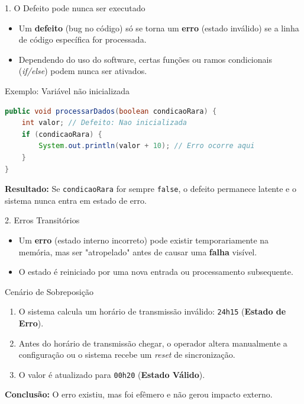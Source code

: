 \documentclass[9pt]{beamer}
\begin{document}
\begin{frame}[fragile]{1. O Defeito pode nunca ser executado}
  \begin{itemize}
    \item Um \textbf{defeito} (bug no código) só se torna um \textbf{erro} (estado inválido) se a linha de código específica for processada.
    \item Dependendo do uso do software, certas funções ou ramos condicionais (\textit{if/else}) podem nunca ser ativados.
  \end{itemize}

  \begin{block}{Exemplo: Variável não inicializada}
    \begin{lstlisting}[language=Java, basicstyle=\ttfamily\small]
public void processarDados(boolean condicaoRara) {
    int valor; // Defeito: Nao inicializada
    if (condicaoRara) {
        System.out.println(valor + 10); // Erro ocorre aqui
    }
}
    \end{lstlisting}
  \end{block}
  
  \textbf{Resultado:} Se \texttt{condicaoRara} for sempre \texttt{false}, o defeito permanece latente e o sistema nunca entra em estado de erro.
\end{frame}

\begin{frame}{2. Erros Transitórios}
  \begin{itemize}
    \item Um \textbf{erro} (estado interno incorreto) pode existir temporariamente na memória, mas ser "atropelado" antes de causar uma \textbf{falha} visível.
    \item O estado é reiniciado por uma nova entrada ou processamento subsequente.
  \end{itemize}

  \begin{exampleblock}{Cenário de Sobreposição}
    \begin{enumerate}
        \item O sistema calcula um horário de transmissão inválido: \texttt{24h15} (\textbf{Estado de Erro}).
        \item Antes do horário de transmissão chegar, o operador altera manualmente a configuração ou o sistema recebe um \textit{reset} de sincronização.
        \item O valor é atualizado para \texttt{00h20} (\textbf{Estado Válido}).
    \end{enumerate}
  \end{exampleblock}
  
  \textbf{Conclusão:} O erro existiu, mas foi efêmero e não gerou impacto externo.
\end{frame}
\end{document}
